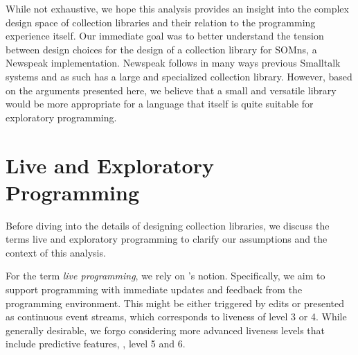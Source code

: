 \documentclass[sigconf, 10pt]{acmart}
\def\SOMns{SOM{\sc ns}\xspace}
\begin{document}
%
%
While not exhaustive, we hope this analysis provides an insight
into the complex design space of collection libraries
and their relation to the programming experience itself.
Our immediate goal was to better understand the tension between design choices
for the design of a collection library for \SOMns, a Newspeak implementation\citep{Bracha:10:NS,OptCELWithTruffle}.
Newspeak follows in many ways previous Smalltalk systems
and as such has a large and specialized collection library.
However, based on the arguments presented here,
we believe that a small and versatile library would be more appropriate
for a language that itself is quite suitable for exploratory programming.


\section{Live and Exploratory Programming}
\label{sec:exploratory}

Before diving into the details of designing collection libraries,
we discuss the terms live and exploratory programming
to clarify our assumptions and the context of this analysis.


For the term \emph{live programming}, we rely on \citeauthor{Tanimoto:1990:Viva}'s notion.
Specifically, we aim to support programming
with immediate updates and feedback from the programming environment.
This might be either triggered by edits or presented as continuous event streams,
which corresponds to liveness of level 3 or 4\citep{Tanimoto:1990:Viva}.
While generally desirable, we forgo considering more advanced liveness levels
that include predictive features, \ie, level 5 and 6\citep{Tanimoto:2013:PEL}.
\end{document}
